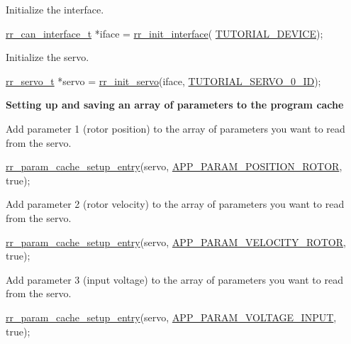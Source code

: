 \begin{DoxyEnumerate}
\item Initialize the interface. 
\begin{DoxyCodeInclude}
    \hyperlink{structrr__can__interface__t}{rr\_can\_interface\_t} *iface = \hyperlink{group___init_ga472a4890dcc7d7a13123c56a06946d91}{rr\_init\_interface}(
      \hyperlink{tutorial_8h_a90947332a0345dc693905e3fc04dbeb2}{TUTORIAL\_DEVICE});
\end{DoxyCodeInclude}

\item Initialize the servo. 
\begin{DoxyCodeInclude}
    \hyperlink{structrr__servo__t}{rr\_servo\_t} *servo = \hyperlink{group___init_ga0adb313a3eeb8a4399431e940a1f3e9e}{rr\_init\_servo}(iface, 
      \hyperlink{tutorial_8h_a9a3d33f25d3a72a8e30c885d238b3b65}{TUTORIAL\_SERVO\_0\_ID});
\end{DoxyCodeInclude}
 {\bfseries  Setting up and saving an array of parameters to the program cache}
\item Add parameter 1 (rotor position) to the array of parameters you want to read from the servo. 
\begin{DoxyCodeInclude}
    \hyperlink{group___realtime_ga770c1e8b4d868cea649592e26a2706dd}{rr\_param\_cache\_setup\_entry}(servo, 
      \hyperlink{api_8h_aa1f58887fab4642cf49f6f453c1d276daa8dafaaa373617ef2f8585b3d4177115}{APP\_PARAM\_POSITION\_ROTOR}, \textcolor{keyword}{true});
\end{DoxyCodeInclude}

\item Add parameter 2 (rotor velocity) to the array of parameters you want to read from the servo. 
\begin{DoxyCodeInclude}
    \hyperlink{group___realtime_ga770c1e8b4d868cea649592e26a2706dd}{rr\_param\_cache\_setup\_entry}(servo, 
      \hyperlink{api_8h_aa1f58887fab4642cf49f6f453c1d276dade3db1d484cf6dd69b115e37ab77051b}{APP\_PARAM\_VELOCITY\_ROTOR}, \textcolor{keyword}{true});
\end{DoxyCodeInclude}

\item Add parameter 3 (input voltage) to the array of parameters you want to read from the servo. 
\begin{DoxyCodeInclude}
    \hyperlink{group___realtime_ga770c1e8b4d868cea649592e26a2706dd}{rr\_param\_cache\_setup\_entry}(servo, 
      \hyperlink{api_8h_aa1f58887fab4642cf49f6f453c1d276da78bc54701f1fe1ce6b90b70bbfa62483}{APP\_PARAM\_VOLTAGE\_INPUT}, \textcolor{keyword}{true});
\end{DoxyCodeInclude}


\end{DoxyEnumerate}
